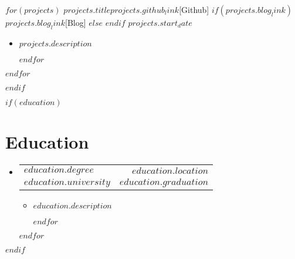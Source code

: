 \documentclass[a4paper,11pt]{article}
\makeatletter
\newcommand{\myuline}[1]{%
  \uline{\phantom{#1}}%
  \llap{\contour{white}{#1}}%
}
\newcommand{\resumeItem}[1]{
  \item\small{
    {#1 \vspace{-2pt}}
  }
}
\newcommand{\resumeSubheading}[4]{
  \vspace{-2pt}\item
    \begin{tabular*}{0.97\textwidth}[t]{l@{\extracolsep{\fill}}r}
      \textbf{#1} & #2 \\
      \textit{\small#3} & \textit{\small #4} \\
    \end{tabular*}\vspace{-7pt}
}
\newcommand{\resumeProjectHeading}[6]{
    \item
    \begin{tabular*}{0.97\textwidth}{l@{\extracolsep{\fill}}r}
      \textbf{#1} \href{#2}{\myuline{#3}} \href{#4}{\myuline{#5}} & #6 \\
    \end{tabular*}\vspace{-7pt}
}
\newcommand{\resumeSubHeadingListStart}{\begin{itemize}[leftmargin=0.15in, label={}]}
\newcommand{\resumeSubHeadingListEnd}{\end{itemize}}
\newcommand{\resumeItemListStart}{\begin{itemize}}
\newcommand{\resumeItemListEnd}{\end{itemize}\vspace{-5pt}}
\makeatother
\begin{document}
    \resumeSubHeadingListStart
      $for(projects)$
        \resumeProjectHeading
          {\textbf{$projects.title$}}{$projects.github_link$}{[Github]}
          $if(projects.blog_link)$
            {$projects.blog_link$}{[Blog]}
          $else$
            {}{}
          $endif$
          {$projects.start_date$}
          \resumeItemListStart
            $for(projects.description)$
              \resumeItem{$projects.description$}
            $endfor$
          \resumeItemListEnd
      $endfor$
    \resumeSubHeadingListEnd
$endif$



$if(education)$
\section{\textbf{\Large Education}}
  \resumeSubHeadingListStart
    $for(education)$
    \resumeSubheading
      {$education.degree$}{$education.location$}
      {$education.university$}{$education.graduation$}
      \resumeItemListStart
        $for(education.description)$
          \resumeItem{$education.description$}
        $endfor$
      \resumeItemListEnd
    $endfor$ 
  \resumeSubHeadingListEnd
$endif$

%
\iffalse
\section{Technical Skills}
 \begin{itemize}[leftmargin=0.15in, label={}]
    \small{\item{
     \textbf{Languages}{: Python, C/C++, SQL, JavaScript, HTML/CSS, R} \\
     \textbf{Frameworks}{: WordPress} \\
     \textbf{Developer Tools}{: Jupyter Notebooks, Git, Google Cloud Platform, VS Code, Amazon AWS} \\
     \textbf{Libraries}{: pandas, plotly}
    }}
 \end{itemize}
\fi

\end{document}
